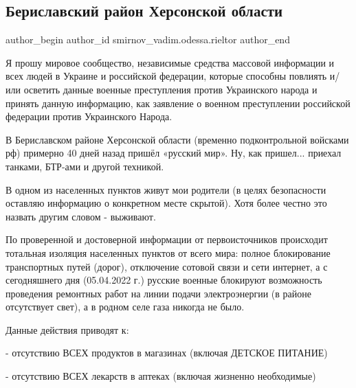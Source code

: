  
 
 
 
 
 
\subsection{Бериславский район Херсонской области}
\label{sec:05_04_2022.fb.smirnov_vadim.odessa.rieltor.1.berislav_rajon}
 
\ifcmt
 author_begin
   author_id smirnov_vadim.odessa.rieltor
 author_end
\fi

Я прошу мировое сообщество, независимые средства массовой информации и всех
людей в Украине и российской федерации, которые способны повлиять и/или
осветить данные военные преступления против Украинского народа и принять данную
информацию, как заявление о военном преступлении российской федерации против
Украинского Народа.

В Бериславском районе Херсонской области (временно подконтрольной войсками рф)
примерно 40 дней назад пришёл «русский мир». Ну, как пришел... приехал танками,
БТР-ами и другой техникой.

В одном из населенных пунктов живут мои родители (в целях безопасности оставляю
информацию о конкретном месте скрытой). Хотя более честно это назвать другим
словом - выживают.

По проверенной и достоверной информации от первоисточников происходит тотальная
изоляция населенных пунктов от всего мира: полное блокирование транспортных
путей (дорог), отключение сотовой связи и сети интернет, а с сегодняшнего дня
(05.04.2022 г.) русские военные блокируют возможность проведения ремонтных
работ на линии подачи электроэнергии (в районе отсутствует свет), а в родном
селе газа никогда не было.

Данные действия приводят к:

- отсутствию ВСЕХ продуктов в магазинах (включая ДЕТСКОЕ ПИТАНИЕ)

- отсутствию ВСЕХ лекарств в аптеках (включая жизненно необходимые)


